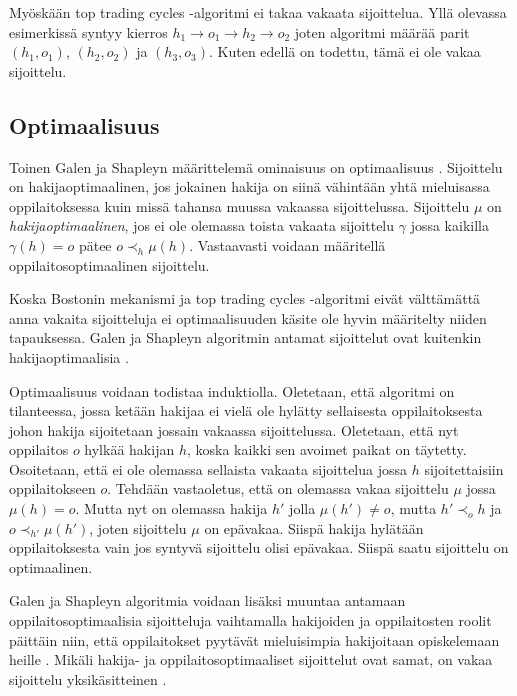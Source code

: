 \documentclass[gradu, twoside]{tktltiki}
\begin{document}
Myöskään top trading cycles -algoritmi ei takaa vakaata sijoittelua.
Yllä olevassa esimerkissä syntyy kierros $h_1 \rightarrow o_1
\rightarrow h_2 \rightarrow o_2$ joten algoritmi määrää parit $(h_1,
o_1)$, $(h_2, o_2)$ ja $(h_3, o_3)$. Kuten edellä on todettu, tämä ei
ole vakaa sijoittelu.

\subsection{Optimaalisuus}

Toinen Galen ja Shapleyn määrittelemä ominaisuus on optimaalisuus
\cite{galeshapley62}. Sijoittelu on hakijaoptimaalinen, jos jokainen
hakija on siinä vähintään yhtä mieluisassa oppilaitoksessa kuin missä
tahansa muussa vakaassa sijoittelussa. Sijoittelu $\mu$ on
\emph{hakijaoptimaalinen}, jos ei ole olemassa toista vakaata
sijoittelu $\gamma$ jossa kaikilla $\gamma(h) = o$ pätee $o \prec_h
\mu(h)$. Vastaavasti voidaan määritellä oppilaitosoptimaalinen
sijoittelu.

Koska Bostonin mekanismi ja top trading cycles -algoritmi eivät
välttämättä anna vakaita sijoitteluja ei optimaalisuuden käsite ole
hyvin määritelty niiden tapauksessa. Galen ja Shapleyn algoritmin
antamat sijoittelut ovat kuitenkin hakijaoptimaalisia
\cite{galeshapley62}.

Optimaalisuus voidaan todistaa induktiolla. Oletetaan, että algoritmi
on tilanteessa, jossa ketään hakijaa ei vielä ole hylätty sellaisesta
oppilaitoksesta johon hakija sijoitetaan jossain vakaassa
sijoittelussa. Oletetaan, että nyt oppilaitos $o$ hylkää hakijan $h$,
koska kaikki sen avoimet paikat on täytetty. Osoitetaan, että ei ole
olemassa sellaista vakaata sijoittelua jossa $h$ sijoitettaisiin
oppilaitokseen $o$. Tehdään vastaoletus, että on olemassa vakaa
sijoittelu $\mu$ jossa $\mu(h) = o$. Mutta nyt on olemassa hakija $h'$
jolla $\mu(h') \neq o$, mutta $h' \prec_o h$ ja $o \prec_{h'}
\mu(h')$, joten sijoittelu $\mu$ on epävakaa. Siispä hakija hylätään
oppilaitoksesta vain jos syntyvä sijoittelu olisi epävakaa. Siispä
saatu sijoittelu on optimaalinen.

Galen ja Shapleyn algoritmia voidaan lisäksi muuntaa antamaan
oppilaitosoptimaalisia sijoitteluja vaihtamalla hakijoiden ja
oppilaitosten roolit päittäin niin, että oppilaitokset pyytävät
mieluisimpia hakijoitaan opiskelemaan heille \cite{galeshapley62}.
Mikäli hakija- ja oppilaitosoptimaaliset sijoittelut ovat samat, on
vakaa sijoittelu yksikäsitteinen \cite{galeshapley62}.
\end{document}
